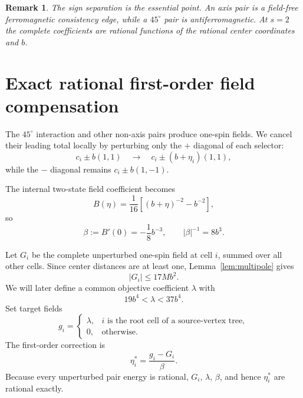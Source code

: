 \documentclass[12pt,a4paper]{article}
\newtheorem{remark}[theorem]{Remark}
\begin{document}
\begin{remark}
The sign separation is the essential point.  An axis pair is a field-free ferromagnetic consistency edge, while a $45^\circ$ pair is antiferromagnetic.  At $s=2$ the complete coefficients are rational functions of the rational center coordinates and $b$.
\end{remark}

\section{Exact rational first-order field compensation}\label{sec:field}

The $45^\circ$ interaction and other non-axis pairs produce one-spin fields.  We cancel their leading total locally by perturbing only the $+$ diagonal of each selector:
\[
 c_i\pm b(1,1)
 \quad\longrightarrow\quad
 c_i\pm(b+\eta_i)(1,1),
\]
while the $-$ diagonal remains $c_i\pm b(1,-1)$.

The internal two-state field coefficient becomes
\begin{equation}\label{eq:B-eta}
 B(\eta)=\frac1{16}\left[(b+\eta)^{-2}-b^{-2}\right],
\end{equation}
so
\begin{equation}\label{eq:beta}
 \beta:=B'(0)=-\frac18b^{-3},
 \qquad |\beta|^{-1}=8b^3.
\end{equation}

Let $G_i$ be the complete unperturbed one-spin field at cell $i$, summed over all other cells.  Since center distances are at least one, Lemma~\ref{lem:multipole} gives
\begin{equation}\label{eq:Gbound}
 |G_i|\le17Mb^2.
\end{equation}
We will later define a common objective coefficient $\lambda$ with
\begin{equation}\label{eq:lambda-range-preview}
 19b^4<\lambda<37b^4.
\end{equation}
Set target fields
\begin{equation}\label{eq:targetfields}
 g_i=\begin{cases}
 \lambda,&i\text{ is the root cell of a source-vertex tree},\\
 0,&\text{otherwise}.
 \end{cases}
\end{equation}
The first-order correction is
\begin{equation}\label{eq:eta-star}
 \eta_i^*=\frac{g_i-G_i}{\beta}.
\end{equation}
Because every unperturbed pair energy is rational, $G_i$, $\lambda$, $\beta$, and hence $\eta_i^*$ are rational exactly.
\end{document}
